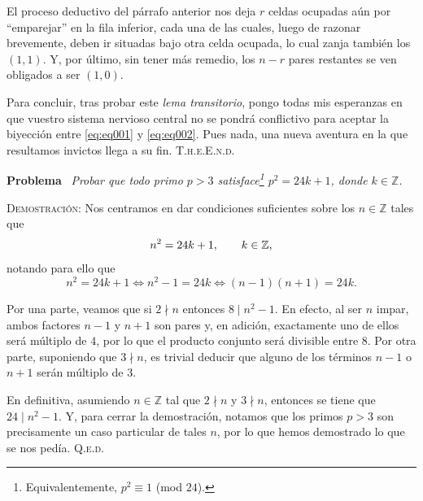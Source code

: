 \documentclass{article}
\begin{document}
El proceso deductivo del párrafo anterior nos deja $r$ celdas ocupadas aún por ``emparejar'' en la fila inferior, cada una de las cuales, luego de razonar brevemente, deben ir situadas bajo otra celda ocupada, lo cual zanja también los $(1, 1)$. Y, por último, sin tener más remedio, los $n - r$ pares restantes se ven obligados a ser $(1, 0)$.

Para concluir, tras probar este \textit{lema transitorio}, pongo todas mis esperanzas en que vuestro sistema nervioso central no se pondrá conflictivo para aceptar la biyección entre \eqref{eq:eq001} y \eqref{eq:eq002}. Pues nada, una nueva aventura en la que resultamos invictos llega a su fin. \hfill{\textsc{T.h.e.E.n.d.}}

\newpage

\noindent\textbf{Problema} \, \textit{Probar que todo primo $p > 3$ satisface\footnote{Equivalentemente, $p^2 \equiv 1$ (mod $24$).} $p^2 = 24k + 1$, donde $k \in \mathbb{Z}$.}

\vspace{7px}

\noindent\textsc{Demostración}: Nos centramos en dar condiciones suficientes sobre los $n \in \mathbb{Z}$ tales que \[n^2 = 24k + 1, \hspace{20px} k \in \mathbb{Z},\] notando para ello que \[n^2 = 24k + 1 \iff n^2 - 1 = 24k \iff (n - 1)(n + 1) = 24k.\]

Por una parte, veamos que si $2 \nmid n$ entonces $8 \mid n^2 - 1$. En efecto, al ser $n$ impar, ambos factores $n - 1$ y $n + 1$ son pares y, en adición, exactamente uno de ellos será múltiplo de $4$, por lo que el producto conjunto será divisible entre $8$.
Por otra parte, suponiendo que $3 \nmid n$, es trivial deducir que alguno de los términos $n - 1$ o $n + 1$ serán múltiplo de $3$.

En definitiva, asumiendo $n \in \mathbb{Z}$ tal que $2 \nmid n$ y $3 \nmid n$, entonces se tiene que $24 \mid n^2 - 1$. Y, para cerrar la demostración, notamos que los primos $p > 3$ son precisamente un caso particular de tales $n$, por lo que hemos demostrado lo que se nos pedía. \hfill{\textsc{Q.e.d.}}
\end{document}
